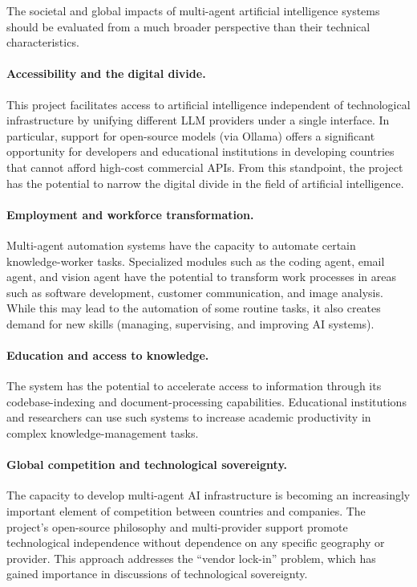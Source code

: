 \documentclass[11pt,a4paper]{report}
\begin{document}
The societal and global impacts of multi-agent artificial intelligence
systems should be evaluated from a much broader perspective than their
technical characteristics.

\paragraph{Accessibility and the digital divide.}
This project facilitates access to artificial intelligence independent of
technological infrastructure by unifying different LLM providers under a
single interface. In particular, support for open-source models (via Ollama)
offers a significant opportunity for developers and educational institutions
in developing countries that cannot afford high-cost commercial APIs. From
this standpoint, the project has the potential to narrow the digital divide
in the field of artificial intelligence.

\paragraph{Employment and workforce transformation.}
Multi-agent automation systems have the capacity to automate certain
knowledge-worker tasks. Specialized modules such as the coding agent, email
agent, and vision agent have the potential to transform work processes in
areas such as software development, customer communication, and image
analysis. While this may lead to the automation of some routine tasks, it
also creates demand for new skills (managing, supervising, and improving AI
systems).

\paragraph{Education and access to knowledge.}
The system has the potential to accelerate access to information through its
codebase-indexing and document-processing capabilities. Educational
institutions and researchers can use such systems to increase academic
productivity in complex knowledge-management tasks.

\paragraph{Global competition and technological sovereignty.}
The capacity to develop multi-agent AI infrastructure is becoming an
increasingly important element of competition between countries and
companies. The project's open-source philosophy and multi-provider support
promote technological independence without dependence on any specific
geography or provider. This approach addresses the ``vendor lock-in'' problem,
which has gained importance in discussions of technological sovereignty.
\end{document}
